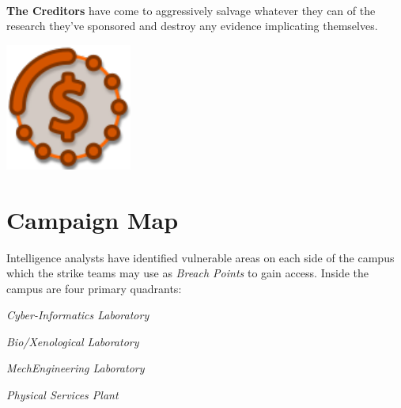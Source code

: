 \begin{minipage}{1.0\linewidth}
  \begin{minipage}[c]{1in}~
  \end{minipage}\quad
  \begin{minipage}[c]{4in}
    \textbf{The Creditors} have come to aggressively salvage
    whatever they can of the research they've sponsored and destroy any
    evidence implicating themselves.
  \end{minipage}\quad
  \begin{minipage}[c]{1in}
    \includegraphics[width=\linewidth]{art/icons/creditors.pdf}
  \end{minipage}
\end{minipage}

\section{Campaign Map}

Intelligence analysts have identified vulnerable areas on each side of
the campus which the strike teams may use as \textit{Breach Points} to
gain access.  Inside the campus are four primary quadrants:

\begin{minipage}[t]{\linewidth}\centering
\begin{minipage}[t]{3in}\centering
 \textit{Cyber-Informatics Laboratory}
  
 \textit{Bio/Xenological Laboratory}
\end{minipage}\quad%
\begin{minipage}[t]{3in}\centering
 \textit{MechEngineering Laboratory}
  
 \textit{Physical Services Plant}
\end{minipage}
\end{minipage}

